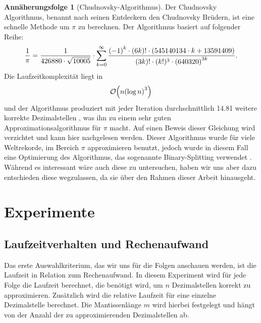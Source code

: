 \documentclass{scrartcl}
\theoremstyle{definition}
\newtheorem{approximation sequence}{Annäherungsfolge}
\DeclarePairedDelimiter{\paren}{\lparen}{\rparen}
\begin{document}
\begin{approximation sequence}[Chudnovsky-Algorithmus]
Der Chudnovsky Algorithmus, benannt nach seinen Entdeckern den Chudnovsky
Brüdern, ist eine schnelle Methode um \(\pi\) zu berechnen. Der Algorithmus
basiert auf folgender Reihe\cite{Chudnovsky}:
\begin{equation*}
    \frac{1}{\pi}
    = \frac{1}{426880 \cdot \sqrt{10005}}
    \cdot \sum_{k = 0}^\infty
    \frac{%
        {(-1)}^k \cdot (6k)! \cdot (545140134 \cdot k + 13591409)
    }{%
        (3k)! \cdot (k!)^3 \cdot {(640320)}^{3k}
    }.
\end{equation*}
Die Laufzeitkomplexität liegt in \[\mathcal{O}\paren*{n{(\log n)}^3}\]
\cite{Runtime-Chudnovsky} und der Algorithmus produziert mit jeder Iteration
durchschnittlich 14.81 weitere korrekte Dezimalstellen
\cite{Nachkommastellen-Chudnovsky}, was ihn zu einem sehr guten
Approximationsalgorithmus für \(\pi\) macht. Auf einen Beweis dieser Gleichung
wird verzichtet und kann hier \cite{Chudnovsky-Proof} nachgelesen werden.
Dieser Algorithmus wurde für viele Weltrekorde, im Bereich \(\pi\)
approximieren benutzt, jedoch wurde in diesem Fall eine Optimierung des
Algorithmus, das sogenannte Binary-Splitting verwendet \cite{Chudnovsky}.
Während es interessant wäre auch diese zu untersuchen, haben wir uns aber dazu
entschieden diese wegzulassen, da sie über den Rahmen dieser Arbeit hinausgeht.

\end{approximation sequence}

\pagebreak

\section{Experimente}

\subsection{Laufzeitverhalten und Rechenaufwand}

Das erste Auswahlkriterium, das wir uns für die Folgen anschauen werden, ist
die Laufzeit in Relation zum Rechenaufwand. In diesem Experiment wird für jede
Folge die Laufzeit berechnet, die benötigt wird, um \(n\) Dezimalstellen
korrekt zu approximieren. Zusätzlich wird die relative Laufzeit für eine
einzelne Dezimalstelle berechnet. Die Mantissenlänge \(m\) wird hierbei
festgelegt und hängt von der Anzahl der zu approximierenden Dezimalstellen ab.
\end{document}
